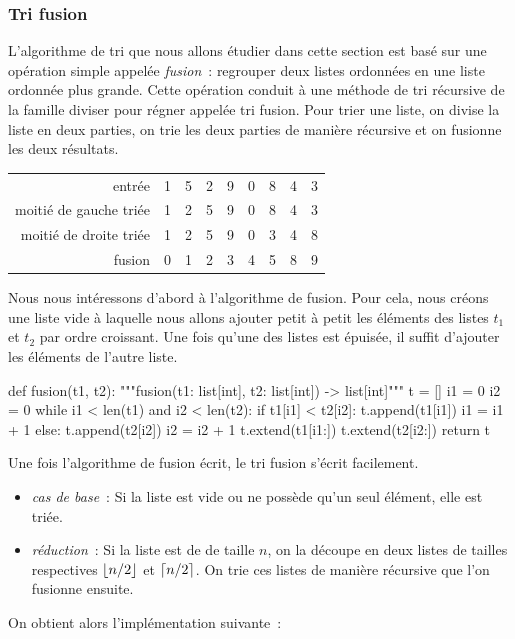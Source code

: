 \documentclass{magnolia}
\begin{document}
\subsubsection{Tri fusion}

L'algorithme de tri que nous allons étudier dans cette section est basé sur une opération
simple appelée \emph{fusion}~: regrouper deux listes ordonnées en une liste
ordonnée plus grande. Cette opération conduit à une méthode de tri récursive 
de la famille \og diviser pour régner \fg appelée
tri fusion. Pour trier une liste, on divise la liste en deux parties, on
trie les deux parties de manière récursive et on fusionne les deux résultats.

\begin{center}
  \begin{tabular}{|r|c|c|c|c|c|c|c|c|}
  \hline
  entrée & 1 & 5 & 2 & 9 & 0 & 8 & 4 & 3\\
  moitié de gauche triée & \color{blue}1 & \color{blue}2 & \color{blue}5 & \color{blue}9 & \color{gray}0 & \color{gray}8 & \color{gray}4 & \color{gray}3\\
  moitié de droite triée & \color{gray}1 & \color{gray}2 & \color{gray}5 & \color{gray}9 & \color{red}0 & \color{red}3 & \color{red}4 & \color{red}8\\ 
  fusion & \color{red}0 & \color{blue}1 & \color{blue}2 & \color{red}3 & \color{red}4 & \color{blue}5 & \color{red}8 & \color{blue}9\\
  \hline
  \end{tabular}
  \end{center}
  
  Nous nous intéressons d'abord à l'algorithme de fusion.
  Pour cela, nous créons une liste vide à laquelle nous allons ajouter petit à petit les
  éléments des listes $t_1$ et $t_2$ par ordre croissant. Une fois qu'une des listes
  est épuisée, il suffit d'ajouter les éléments de l'autre liste.

\begin{pythoncode}
def fusion(t1, t2):
    """fusion(t1: list[int], t2: list[int]) -> list[int]"""
    t = []
    i1 = 0
    i2 = 0
    while i1 < len(t1) and i2 < len(t2):
        if t1[i1] < t2[i2]:
            t.append(t1[i1])
            i1 = i1 + 1
        else:
            t.append(t2[i2])
            i2 = i2 + 1
    t.extend(t1[i1:])
    t.extend(t2[i2:])
    return t
\end{pythoncode}

Une fois l'algorithme de fusion écrit, le tri fusion s'écrit facilement.
\begin{itemize}
\item \emph{cas de base}~: Si la liste est vide ou ne possède qu'un seul élément,
  elle est triée.
\item \emph{réduction}~: Si la liste est de de taille $n$, on la découpe en deux
  listes de tailles respectives $\left\lfloor n/2\right\rfloor$ et $\left\lceil n/2\right\rceil$. On trie ces listes
  de manière récursive que l'on fusionne ensuite.
\end{itemize}
On obtient alors l'implémentation suivante~:
\end{document}

